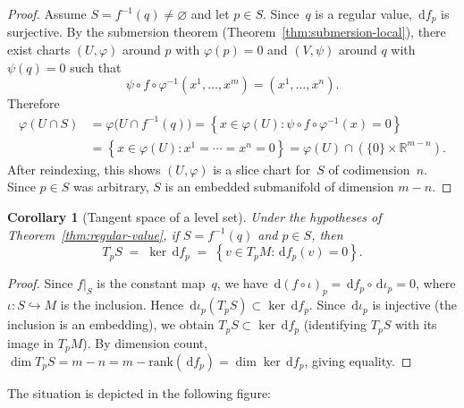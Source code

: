 \documentclass[12pt,a4paper,openany]{book}
\newtheorem{corollary}[theorem]{Corollary}
\theoremstyle{definition}
\theoremstyle{remark}
\newcommand{\R}{\mathbb{R}}
\newcommand{\dd}{\,\mathrm{d}}
\newcommand{\set}[1]{\left\{ #1 \right\}}
\begin{document}
\begin{proof}
Assume $S = f^{-1}(q) \neq \varnothing$ and let $p \in S$.
Since~$q$ is a regular value, $\dd f_p$ is surjective.  By the
submersion theorem (Theorem~\ref{thm:submersion-local}), there exist
charts $(U, \varphi)$ around $p$ with $\varphi(p) = 0$ and $(V, \psi)$
around $q$ with $\psi(q) = 0$ such that
\[
  \psi \circ f \circ \varphi^{-1}(x^1, \dots, x^m)
  = (x^1, \dots, x^n).
\]
Therefore
\begin{align*}
  \varphi(U \cap S)
  &= \varphi\bigl(U \cap f^{-1}(q)\bigr)
  = \set{x \in \varphi(U) : \psi \circ f \circ \varphi^{-1}(x) = 0} \\
  &= \set{x \in \varphi(U) : x^1 = \cdots = x^n = 0}
  = \varphi(U) \cap (\{0\} \times \R^{m-n}).
\end{align*}
After reindexing, this shows $(U, \varphi)$ is a slice chart for~$S$
of codimension~$n$.  Since $p \in S$ was arbitrary, $S$ is an embedded
submanifold of dimension $m - n$.
\end{proof}

\begin{corollary}[Tangent space of a level set]\label{cor:tangent-level-set}%
Under the hypotheses of Theorem~\ref{thm:regular-value}, if
$S = f^{-1}(q)$ and $p \in S$, then
\[
  T_pS \;=\; \ker \dd f_p
  \;=\; \set{v \in T_pM : \dd f_p(v) = 0}.
\]
\end{corollary}

\begin{proof}
Since $f|_S$ is the constant map~$q$, we have
$\dd(f \circ \iota)_p = \dd f_p \circ \dd\iota_p = 0$, where
$\iota \colon S \hookrightarrow M$ is the inclusion.  Hence
$\dd\iota_p(T_pS) \subset \ker \dd f_p$.  Since $\dd\iota_p$ is
injective (the inclusion is an embedding), we obtain
$T_pS \subset \ker \dd f_p$ (identifying $T_pS$ with its image in
$T_pM$).  By dimension count,
$\dim T_pS = m - n = m - \mathrm{rank}(\dd f_p)
= \dim \ker \dd f_p$, giving equality.
\end{proof}

The situation is depicted in the following figure:
\end{document}
